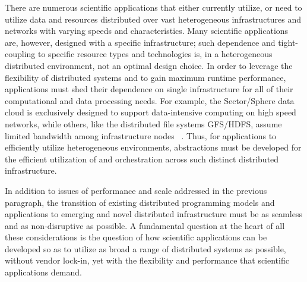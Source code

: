 \documentclass[3p,twocolumn]{elsarticle}
\begin{document}
There are numerous scientific applications that either currently
utilize, or need to utilize data and resources distributed over vast
heterogeneous infrastructures and networks with varying speeds and
characteristics.  Many scientific applications are, however, designed
with a specific infrastructure; such dependence and
tight-coupling to specific resource types and technologies is, in a
heterogeneous distributed environment, not an optimal design choice.
In order to leverage the flexibility of distributed systems and to
gain maximum runtime performance, applications must shed their
dependence on single infrastructure for all of their computational and
data processing needs. For example, the Sector/Sphere data cloud is
exclusively designed to support data-intensive computing on high speed
networks, while others, like the distributed file systems GFS/HDFS,
assume limited bandwidth among infrastructure nodes ~\cite{GFS, HDFS}.
Thus, for applications to efficiently utilize heterogeneous
environments, abstractions must be developed for the efficient
utilization of and orchestration across such distinct distributed
infrastructure.


In addition to issues of performance and scale addressed in the
previous paragraph, the transition of existing distributed programming
models and applications to emerging and novel distributed
infrastructure must be as seamless and as non-disruptive as
possible.  A fundamental question at the heart of all these
considerations is the question of how scientific applications can be
developed so as to utilize as broad a range of distributed systems as
possible, without vendor lock-in, yet with the flexibility and
performance that scientific applications demand.

\end{document}
